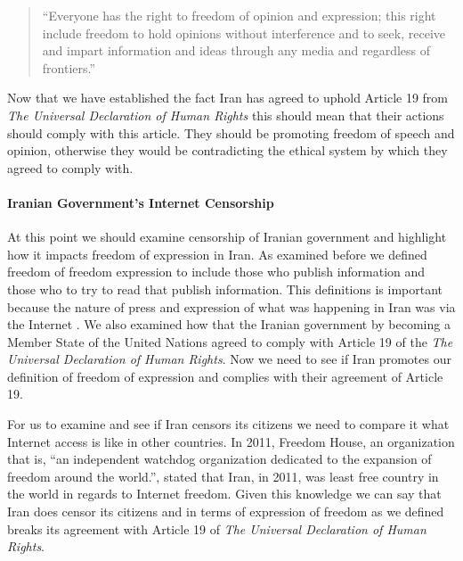 \documentclass[11pt]{article}
\begin{document}
\begin{multicols}{2}
\begin{quotation} 
  ``Everyone has the right to freedom of opinion and expression;
  this right include freedom to hold opinions without interference and to seek,
  receive and impart information and ideas through any media and regardless of
  frontiers.''\cite{UniversalDeclerationOfHumanRights}
\end{quotation}

Now that we have established the fact Iran has agreed to uphold Article 19
from \textit{The Universal Declaration of Human Rights} this should mean that
their actions should comply with this article. They should be promoting freedom
of speech and opinion, otherwise they would be contradicting the ethical system
by which they agreed to comply with.

\paragraph{Iranian Government's Internet Censorship}

At this point we should examine censorship of Iranian government and highlight
how it impacts freedom of expression in Iran. As examined before we defined
freedom of freedom expression to include those who publish information and those
who to try to read that publish information. This definitions is important
because the nature of press and expression of what was happening in Iran was via
the Internet . We also examined how that the Iranian government by becoming a
Member State of the United Nations agreed to comply with Article 19 of the
\textit{The Universal Declaration of Human Rights}. Now we need to see if Iran
promotes our definition of freedom of expression and complies with their
agreement of Article 19.

For us to examine and see if Iran censors its citizens we need to compare it
what Internet access is like in other countries. In 2011, Freedom House, an
organization that is, ``an independent watchdog organization dedicated to the
expansion of freedom around the world.''\cite{FreedomHouse}, stated that Iran,
in 2011, was least free country in the world in regards to Internet
freedom.\cite{FreedomOnNet2011, ONI:IranWorst} Given this knowledge we can say
that Iran does censor its citizens and in terms of expression of freedom as we
defined breaks its agreement with Article 19 of \textit{The Universal
Declaration of Human Rights}. 



\end{multicols}
\end{document}
